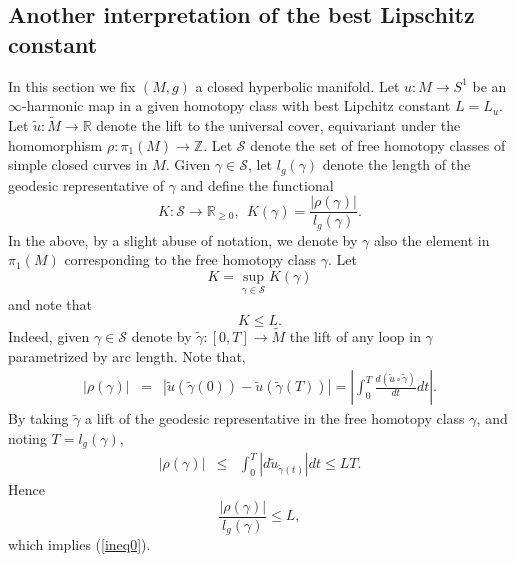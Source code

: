 \documentclass{ip-journal}
\theoremstyle{definition}
\numberwithin{equation}{section}
\newcommand{\R}{\mathbb R}
\newcommand{\Z}{\mathbb Z}
\begin{document}
\subsection{Another interpretation of the best Lipschitz constant} 
In this section we fix $(M,g)$ a closed hyperbolic manifold. Let $u: M \rightarrow S^1$ be an $\infty$-harmonic map in a given homotopy class  with best Lipchitz constant $L=L_u$. Let
$\tilde u : \tilde M \rightarrow \R$
denote the lift to the universal cover, equivariant  under the homomorphism $\rho:  \pi_1(M) \rightarrow \Z$. 
Let $\mathcal S$ denote the set of free homotopy classes of simple closed curves in $M$.  Given $\gamma \in \mathcal S$,
let $l_g(\gamma)$ denote the length of the geodesic representative of $\gamma$ and
define the functional
\begin{equation}\label{normlength}
K: \mathcal S \rightarrow \R_{\geq 0}, \ \  K(\gamma)=  \frac{|\rho(\gamma)|}{l_g(\gamma)}.
\end{equation}
In the above, by a slight abuse of notation, we denote by $\gamma$ also the element in $\pi_1(M)$ corresponding to the free homotopy class $\gamma$.
Let 
\[
K= \sup_{\gamma \in  \mathcal S} K(\gamma)
\]
and note that 
\begin{equation}\label{ineq0}
K \leq L.
\end{equation} 
Indeed, given $\gamma \in \mathcal S$ denote by $\tilde \gamma: [0, T] \rightarrow \tilde M$ the lift of any loop in  $\gamma$ parametrized by arc length. Note that,
\begin{eqnarray}\label{water}
|\rho(\gamma)|&=&  |\tilde u(\tilde \gamma(0))-  \tilde u(\tilde \gamma(T))| 
 = \left |\int_0^T  \frac{d(\tilde u \circ \tilde \gamma)}{dt}  dt  \right |.
 \end{eqnarray}
By taking $\tilde \gamma$ a lift of the geodesic representative in the free homotopy class $\gamma$, and noting $T=l_g(\gamma)$,
\begin{eqnarray}\label{water2}
|\rho(\gamma)|
 &\leq& \int_0^T \left |d \tilde u_{ \tilde \gamma(t)} \right | dt  \leq LT. \nonumber
\end{eqnarray}
Hence
\[
\frac{|\rho(\gamma)|}{l_g(\gamma)} \leq L,
\]
which implies (\ref{ineq0}). 
\end{document}
